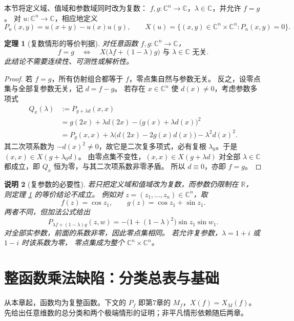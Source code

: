 \documentclass[11pt,a4paper,oneside,openany]{book}
\theoremstyle{lecture}
\newtheorem{theorem}{定理}[section]
\newtheorem{remark}[theorem]{说明}
\newcommand{\R}{\mathbb R}
\newcommand{\C}{\mathbb C}
\numberwithin{equation}{section}
\begin{document}
本节将定义域、值域和参数域同时改为复数：
$f,g:\C^n\to\C$，$\lambda\in\C$，并允许 $f=g$。
对 $u:\C^n\to\C$，相应地定义
\[
 P_u(x,y)=u(x+y)-u(x)u(y),\qquad
 X(u)=\{(x,y)\in\C^n\times\C^n:P_u(x,y)=0\}.
\]

\begin{theorem}[复数情形的等价判据]\label{grp:complexrigidity}
对任意函数 $f,g:\C^n\to\C$，
\begin{equation}\label{grp:complexiff}
 \boxed{\quad f=g\quad\Longleftrightarrow\quad
 X\bigl(\lambda f+(1-\lambda)g\bigr)
 \text{ 与 }\lambda\in\C\text{ 无关}.\quad}
\end{equation}
此结论不需要连续性、可测性或解析性。
\end{theorem}

\begin{proof}
若 $f=g$，所有仿射组合都等于 $f$，零点集自然与参数无关。
反之，设零点集与全部复参数无关，记 $d=f-g$。
若存在 $x\in\C^n$ 使 $d(x)\ne0$，考虑参数多项式
\begin{equation}\label{grp:complexdiagonal}
\begin{split}
 Q_x(\lambda)
 &:=P_{g+\lambda d}(x,x)\\
 &=g(2x)+\lambda d(2x)
   -\bigl(g(x)+\lambda d(x)\bigr)^2\\
 &=P_g(x,x)
   +\lambda\bigl(d(2x)-2g(x)d(x)\bigr)
   -\lambda^2d(x)^2.
\end{split}
\end{equation}
其二次项系数为 $-d(x)^2\ne0$，故它是二次复多项式，必有复根
$\lambda_0$。于是 $(x,x)\in X(g+\lambda_0d)$。
由零点集不变性，$(x,x)\in X(g+\lambda d)$ 对全部 $\lambda\in\C$
都成立，即 $Q_x$ 恒为零，与其二次项系数非零矛盾。
所以 $d\equiv0$，亦即 $f=g$。
\end{proof}

\begin{remark}[复参数的必要性]
若只把定义域和值域改为复数，而参数仍限制在 $\R$，
则定理 \ref{grp:complexrigidity} 的等价结论不成立。
例如对 $z=(z_1,\ldots,z_n)\in\C^n$，取
\[
 f(z)=\cos z_1,\qquad g(z)=\cos z_1+\sin z_1.
\]
两者不同，但加法公式给出
\[
 P_{\lambda f+(1-\lambda)g}(z,w)
 =-\bigl(1+(1-\lambda)^2\bigr)\sin z_1\sin w_1.
\]
对全部实参数，前面的系数非零，因此零点集相同。
若允许复参数，$\lambda=1+i$ 或 $1-i$ 时该系数为零，
零点集成为整个 $\C^n\times\C^n$。
\end{remark}


\chapter{整函数乘法缺陷：分类总表与基础}\label{ch:entire}
从本章起，函数均为复整函数。下文的 $P_f$ 即第7章的 $M_f$，$X(f)=X_M(f)$。先给出任意维数的总分类和两个极端情形的证明；非平凡情形依赖随后两章。
\end{document}
